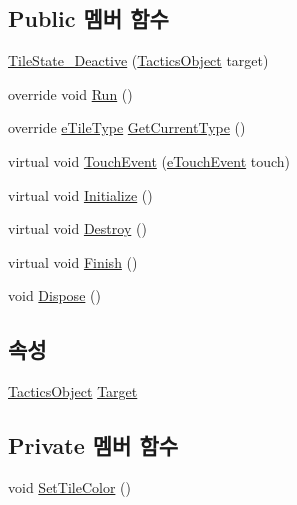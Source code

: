 \subsection*{Public 멤버 함수}
\begin{DoxyCompactItemize}
\item 
\hyperlink{class_tile_1_1_tile_state___deactive_ac54bf790e9656300ad696f6d5bc3cb2b}{Tile\+State\+\_\+\+Deactive} (\hyperlink{class_tactics_object}{Tactics\+Object} target)
\item 
override void \hyperlink{class_tile_1_1_tile_state___deactive_a806c5dbc5eb43903ad41d448f3d25c61}{Run} ()
\item 
override \hyperlink{_tile_8cs_a271bc07be325bca511bcb747e0ff2fda}{e\+Tile\+Type} \hyperlink{class_tile_1_1_tile_state___deactive_a1aed8e0336e11dcb55cb598119c53eda}{Get\+Current\+Type} ()
\item 
virtual void \hyperlink{class_tile_1_1_tile_state_a3ddb7ad41bed1404287b6847dd4edf05}{Touch\+Event} (\hyperlink{_touch_manager_8cs_ae33e321a424fe84ba8b2fdb81ad40a68}{e\+Touch\+Event} touch)
\item 
virtual void \hyperlink{class_m_c_n_1_1_state_a5be59bc891e64cbbe4322d74a6746908}{Initialize} ()
\item 
virtual void \hyperlink{class_m_c_n_1_1_state_aebf48ef248bbf185d6aae91d9789459e}{Destroy} ()
\item 
virtual void \hyperlink{class_m_c_n_1_1_state_a2492ca731678b8216c02134dddeeb745}{Finish} ()
\item 
void \hyperlink{class_m_c_n_1_1_state_af6df0477e0dead784489688cb2c2093e}{Dispose} ()
\end{DoxyCompactItemize}
\subsection*{속성}
\begin{DoxyCompactItemize}
\item 
\hyperlink{class_tactics_object}{Tactics\+Object} \hyperlink{class_m_c_n_1_1_state_a79a563b32f183c9adc9a96679fc57eb8}{Target}
\end{DoxyCompactItemize}
\subsection*{Private 멤버 함수}
\begin{DoxyCompactItemize}
\item 
void \hyperlink{class_tile_1_1_tile_state___deactive_ac0b9d7d4a64b2c320eeb2679fc6ad459}{Set\+Tile\+Color} ()
\end{DoxyCompactItemize}


